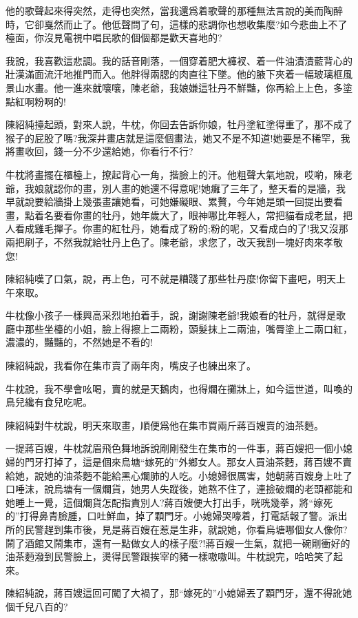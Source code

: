 \documentclass[a6paper]{article}
\begin{document}
他的歌聲起來得突然，走得也突然，當我還爲着歌聲的那種無法言說的美而陶醉時，它卻戛然而止了。他低聲問了句，這樣的悲調你也想收集麼?如今悲曲上不了檯面，你沒見電視中唱民歌的個個都是歡天喜地的?

我說，我喜歡這悲調。我的話音剛落，一個穿着肥大褲衩、着一件油漬漬藍背心的壯漢滿面流汗地推門而入。他胖得兩腮的肉直往下墜。他的腋下夾着一幅玻璃框風景山水畫。他一進來就嚷嚷，陳老爺，我娘嫌這牡丹不鮮豔，你再給上上色，多塗點紅啊粉啊的!

陳紹純擡起頭，對來人說，牛枕，你回去告訴你娘，牡丹塗紅塗得重了，那不成了猴子的屁股了嗎?我深井畫店就是這麼個畫法，她又不是不知道!她要是不稀罕，我將畫收回，錢一分不少還給她，你看行不行?

牛枕將畫擺在櫃檯上，撩起背心一角，揩臉上的汗。他粗聲大氣地說，哎喲，陳老爺，我娘就認你的畫，別人畫的她還不得意呢!她癱了三年了，整天看的是牆，我早就說要給牆掛上幾張畫讓她看，可她嫌礙眼、累贅，今年她是頭一回提出要看畫，點着名要看你畫的牡丹，她年歲大了，眼神哪比年輕人，常把貓看成老鼠，把人看成雞毛撣子。你畫的紅牡丹，她看成了粉的;粉的呢，又看成白的了!我又沒那兩把刷子，不然我就給牡丹上色了。陳老爺，求您了，改天我割一塊好肉來孝敬您!

陳紹純嘆了口氣，說，再上色，可不就是糟踐了那些牡丹麼!你留下畫吧，明天上午來取。

牛枕像小孩子一樣興高采烈地拍着手，說，謝謝陳老爺!我娘看的牡丹，就得是歌廳中那些坐檯的小姐，臉上得擦上二兩粉，頭髮抹上二兩油，嘴脣塗上二兩口紅，濃濃的，豔豔的，不然她是不看的!

陳紹純說，我看你在集市賣了兩年肉，嘴皮子也練出來了。

牛枕說，我不學會吆喝，賣的就是天鵝肉，也得爛在攤牀上，如今這世道，叫喚的鳥兒纔有食兒吃呢。

陳紹純對牛枕說，明天來取畫，順便爲他在集市買兩斤蔣百嫂賣的油茶麪。

一提蔣百嫂，牛枕就眉飛色舞地訴說剛剛發生在集市的一件事，蔣百嫂把一個小媳婦的門牙打掉了，這是個來烏塘“嫁死的”外鄉女人。那女人買油茶麪，蔣百嫂不賣給她，說她的油茶麪不能給黑心爛肺的人吃。小媳婦很厲害，她朝蔣百嫂身上吐了口唾沫，說烏塘有一個爛貨，她男人失蹤後，她熬不住了，連撿破爛的老頭都能和她睡上一覺，這個爛貨怎配指責別人?蔣百嫂便大打出手，咣咣幾拳，將“嫁死的”打得鼻青臉腫，口吐鮮血，掉了顆門牙。小媳婦哭嚎着，打電話報了警。派出所的民警趕到集市後，見是蔣百嫂在惹是生非，就說她，你看烏塘哪個女人像你?鬧了酒館又鬧集市，還有一點做女人的樣子麼?!蔣百嫂一生氣，就把一碗剛衝好的油茶麪潑到民警臉上，燙得民警跟挨宰的豬一樣嗷嗷叫。牛枕說完，哈哈笑了起來。

陳紹純說，蔣百嫂這回可闖了大禍了，那“嫁死的”小媳婦丟了顆門牙，還不得訛她個千兒八百的?
\end{document}
